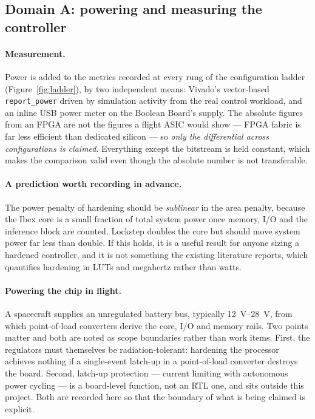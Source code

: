 \documentclass[11pt,a4paper]{article}
\begin{document}
\subsection{Domain A: powering and measuring the controller}

\paragraph{Measurement.} Power is added to the metrics recorded at every rung of
the configuration ladder (Figure~\ref{fig:ladder}), by two independent means:
Vivado's vector-based \texttt{report\_power} driven by simulation activity from
the real control workload, and an inline USB power meter on the Boolean Board's
supply. The absolute figures from an FPGA are not the figures a flight ASIC would
show --- FPGA fabric is far less efficient than dedicated silicon --- so
\emph{only the differential across configurations is claimed}. Everything except
the bitstream is held constant, which makes the comparison valid even though the
absolute number is not transferable.

\paragraph{A prediction worth recording in advance.} The power penalty of
hardening should be \emph{sublinear} in the area penalty, because the Ibex core
is a small fraction of total system power once memory, I/O and the inference
block are counted. Lockstep doubles the core but should move system power far
less than double. If this holds, it is a useful result for anyone sizing a
hardened controller, and it is not something the existing literature reports,
which quantifies hardening in LUTs and megahertz rather than watts.

\paragraph{Powering the chip in flight.} A spacecraft supplies an unregulated
battery bus, typically \SIrange{12}{28}{\volt}, from which point-of-load
converters derive the core, I/O and memory rails. Two points matter and both are
noted as scope boundaries rather than work items. First, the regulators must
themselves be radiation-tolerant: hardening the processor achieves nothing if a
single-event latch-up in a point-of-load converter destroys the board. Second,
latch-up protection --- current limiting with autonomous power cycling --- is a
board-level function, not an RTL one, and sits outside this project. Both are
recorded here so that the boundary of what is being claimed is explicit.
\end{document}
